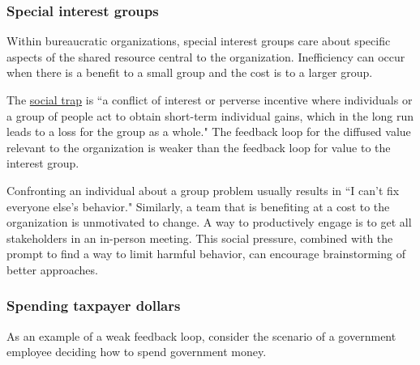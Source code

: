 \subsubsection*{Special interest groups}

Within bureaucratic organizations, special interest groups care about specific aspects of the shared resource central to the organization. 
Inefficiency can occur when there is a benefit to a small group and the cost is to a larger group.

The \href{https://en.wikipedia.org/wiki/Social_trap}{social trap}
\iftoggle{WPinmargin}{\marginpar{$>$Wikipedia: social trap}}{}
is ``a conflict of interest or perverse incentive where individuals or a group of people act to obtain short-term individual gains, which in the long run leads to a loss for the group as a whole."
The feedback loop for the diffused value relevant to the organization is weaker than the feedback loop for value to the interest group. 

Confronting an individual about a group problem usually results in ``I can't fix everyone else's behavior." Similarly, a team that is benefiting at a cost to the organization is unmotivated to change. A way to productively engage is to get all stakeholders in an in-person meeting. This social pressure, combined with the prompt to find a way to limit harmful behavior, can encourage brainstorming of better approaches. 

\subsubsection*{Spending taxpayer dollars}

As an example of a weak feedback loop, consider the scenario of a government employee deciding how to spend government money.

